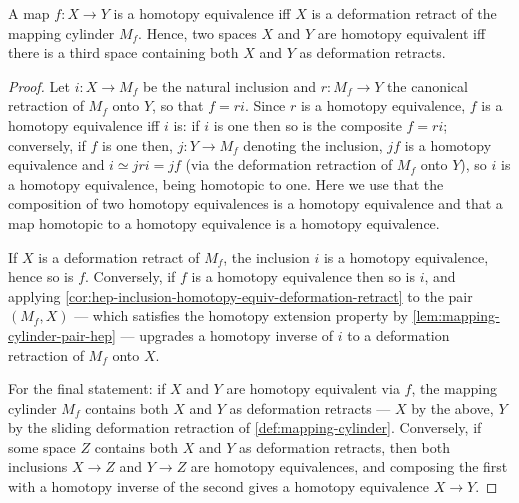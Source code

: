 \begin{corollary}
\label{cor:homotopy-equivalence-iff-deformation-retract-mapping-cylinder}
\leanok
{}
A map $f : X \to Y$ is a homotopy equivalence iff $X$ is a deformation retract of the
mapping cylinder $M_f$. Hence, two spaces $X$ and $Y$ are homotopy equivalent iff
there is a third space containing both $X$ and $Y$ as deformation retracts.
\end{corollary}

\begin{proof}
\leanok
Let $i : X \to M_f$ be the natural inclusion and $r : M_f \to Y$ the canonical
retraction of $M_f$ onto $Y$, so that $f = ri$. Since $r$ is a homotopy equivalence,
$f$ is a homotopy equivalence iff $i$ is: if $i$ is one then so is the composite
$f = ri$; conversely, if $f$ is one then, $j : Y \to M_f$ denoting the inclusion,
$jf$ is a homotopy equivalence and $i \simeq jri = jf$ (via the deformation
retraction of $M_f$ onto $Y$), so $i$ is a homotopy equivalence, being homotopic to
one. Here we use that the composition of two homotopy equivalences is a homotopy
equivalence and that a map homotopic to a homotopy equivalence is a homotopy
equivalence.

If $X$ is a deformation retract of $M_f$, the inclusion $i$ is a homotopy
equivalence, hence so is $f$. Conversely, if $f$ is a homotopy equivalence then so is
$i$, and applying \cref{cor:hep-inclusion-homotopy-equiv-deformation-retract} to the
pair $(M_f, X)$ — which satisfies the homotopy extension property by
\cref{lem:mapping-cylinder-pair-hep} — upgrades a homotopy inverse of $i$ to a
deformation retraction of $M_f$ onto $X$.

For the final statement: if $X$ and $Y$ are homotopy equivalent via $f$, the mapping
cylinder $M_f$ contains both $X$ and $Y$ as deformation retracts — $X$ by the above,
$Y$ by the sliding deformation retraction of \cref{def:mapping-cylinder}. Conversely,
if some space $Z$ contains both $X$ and $Y$ as deformation retracts, then both
inclusions $X \to Z$ and $Y \to Z$ are homotopy equivalences, and composing the first
with a homotopy inverse of the second gives a homotopy equivalence $X \to Y$.
\end{proof}

